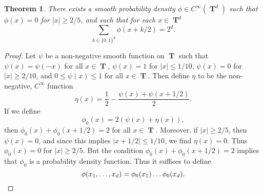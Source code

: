 \documentclass[12pt,reqno]{article}
\numberwithin{equation}{section}
\DeclareMathOperator{\TT}{\mathbf{T}}
\newtheorem{theorem}{Theorem}
\begin{document}
\begin{theorem} \label{equationASFGCISIX}
    There exists a smooth probability density $\phi \in C^\infty(\TT^d)$ such that $\phi(x) = 0$ for $|x| \geq 2/5$, and such that for each $x \in \TT^d$
    \[ \sum_{k \in \{ 0, 1 \}^d} \phi(x + k/2) = 2^d. \]
\end{theorem}
\begin{proof}
    Let $\psi$ be a non-negative smooth function on $\TT$ such that $\psi(x) = \psi(- x)$ for all $x \in \TT$, $\psi(x) = 1$ for $|x| \leq 1/10$, $\psi(x) = 0$ for $|x| \geq 2/10$, and $0 \leq \psi(x) \leq 1$ for all $x \in \TT$. Then define $\eta$ to be the non-negative, $C^\infty$ function
    \[ \eta(x) = \frac{1}{2} - \frac{\psi(x) + \psi(x + 1/2)}{2}. \]
    If we define
    \[ \phi_0(x) = 2(\psi(x) + \eta(x)), \]
    then $\phi_0(x) + \phi_0(x + 1/2) = 2$ for all $x \in \TT$. Moreover, if $|x| \geq 2/5$, then $\psi(x) = 0$, and since this implies $|x + 1/2| \leq 1/10$, we find $\eta(x) = 0$. Thus $\phi_0(x) = 0$ for $|x| \geq 2/5$. But the condition $\phi_0(x) + \phi_0(x + 1/2) = 2$ implies that $\phi_0$ is a probability density function. Thus it suffices to define
    \[ \phi(x_1, \dots, x_d) = \phi_0(x_1) \dots \phi_0(x_d). \qedhere \]
\end{proof}
\end{document}
